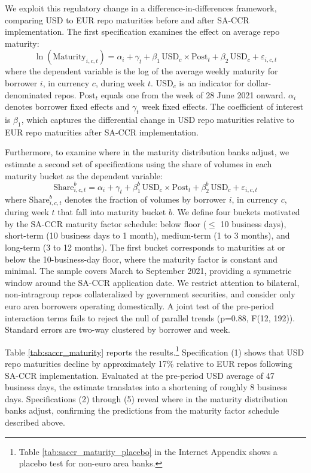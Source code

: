 \documentclass[english, 12pt, oneside]{article}
\begin{document}
We exploit this regulatory change in a difference-in-differences framework, comparing USD to EUR repo maturities before and after SA-CCR implementation. The first specification examines the effect on average repo maturity:
\begin{equation}
\ln(\text{Maturity}_{i,c,t}) = \alpha_i + \gamma_t + \beta_1 \, \text{USD}_c \times \text{Post}_t + \beta_2 \, \text{USD}_c + \varepsilon_{i,c,t}
\end{equation}
where the dependent variable is the log of the average weekly maturity for borrower $i$, in currency $c$, during week $t$. $\text{USD}_c$ is an indicator for dollar-denominated repos. $\text{Post}_t$ equals one from the week of 28 June 2021 onward. $\alpha_i$ denotes borrower fixed effects and $\gamma_t$ week fixed effects. The coefficient of interest is $\beta_1$, which captures the differential change in USD repo maturities relative to EUR repo maturities after SA-CCR implementation.

Furthermore, to examine where in the maturity distribution banks adjust, we estimate a second set of specifications using the share of volumes in each maturity bucket as the dependent variable:
\begin{equation}
\text{Share}^{b}_{i,c,t} = \alpha_i + \gamma_t + \beta^{b}_1 \, \text{USD}_c \times \text{Post}_t + \beta^{b}_2 \, \text{USD}_c + \varepsilon_{i,c,t}
\end{equation}
where $\text{Share}^{b}_{i,c,t}$ denotes the fraction of volumes by borrower $i$, in currency $c$, during week $t$ that fall into maturity bucket $b$. We define four buckets motivated by the SA-CCR maturity factor schedule: below floor ($\leq$ 10 business days), short-term (10 business days to 1 month), medium-term (1 to 3 months), and long-term (3 to 12 months). The first bucket corresponds to maturities at or below the 10-business-day floor, where the maturity factor is constant and minimal. The sample covers March to September 2021, providing a symmetric window around the SA-CCR application date. We restrict attention to bilateral, non-intragroup repos collateralized by government securities, and consider only euro area borrowers operating domestically. A joint test of the pre-period interaction terms fails to reject the null of parallel trends (p=0.88, F(12, 192)). Standard errors are two-way clustered by borrower and week.

Table \ref{tab:saccr_maturity} reports the results.\footnote{Table \ref{tab:saccr_maturity_placebo} in the Internet Appendix shows a placebo test for non-euro area banks.} Specification (1) shows that USD repo maturities decline by approximately 17\% relative to EUR repos following SA-CCR implementation. Evaluated at the pre-period USD average of 47 business days, the estimate translates into a shortening of roughly 8 business days. Specifications (2) through (5) reveal where in the maturity distribution banks adjust, confirming the predictions from the maturity factor schedule described above.
\end{document}

